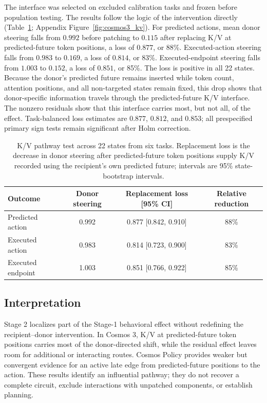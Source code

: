 \documentclass{article}
\begin{document}
The interface was selected on excluded calibration tasks and frozen before population testing. The results follow the logic of the intervention directly (Table~\ref{tab:kv_pathway}; Appendix Figure~\ref{fig:cosmos3_kv}). For predicted actions, mean donor steering falls from $0.992$ before patching to $0.115$ after replacing K/V at predicted-future token positions, a loss of $0.877$, or 88\%. Executed-action steering falls from $0.983$ to $0.169$, a loss of $0.814$, or 83\%. Executed-endpoint steering falls from $1.003$ to $0.152$, a loss of $0.851$, or 85\%. The loss is positive in all 22 states. Because the donor's predicted future remains inserted while token count, attention positions, and all non-targeted states remain fixed, this drop shows that donor-specific information travels through the predicted-future K/V interface. The nonzero residuals show that this interface carries most, but not all, of the effect. Task-balanced loss estimates are $0.877$, $0.812$, and $0.853$; all prespecified primary sign tests remain significant after Holm correction.

\begin{table}[t]
  \centering
  \caption{K/V pathway test across 22 states from six tasks. Replacement loss is the decrease in donor steering after predicted-future token positions supply K/V recorded using the recipient's own predicted future; intervals are 95\% state-bootstrap intervals.}
  \label{tab:kv_pathway}
  \footnotesize
  \setlength{\tabcolsep}{6pt}
  \begin{tabular}{@{}lccc@{}}
    \toprule
    Outcome & Donor steering & Replacement loss [95\% CI] & Relative reduction \\
    \midrule
    Predicted action & 0.992 & 0.877 [0.842, 0.910] & 88\% \\
    Executed action & 0.983 & 0.814 [0.723, 0.900] & 83\% \\
    Executed endpoint & 1.003 & 0.851 [0.766, 0.922] & 85\% \\
    \bottomrule
  \end{tabular}
\end{table}

\subsection{Interpretation}

Stage 2 localizes part of the Stage-1 behavioral effect without redefining the recipient--donor intervention. In Cosmos 3, K/V at predicted-future token positions carries most of the donor-directed shift, while the residual effect leaves room for additional or interacting routes. Cosmos Policy provides weaker but convergent evidence for an active late edge from predicted-future positions to the action. These results identify an influential pathway; they do not recover a complete circuit, exclude interactions with unpatched components, or establish planning.
\end{document}

